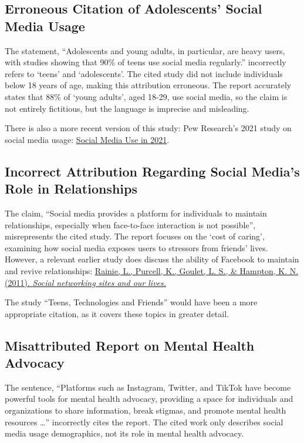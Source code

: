 \documentclass[12pt]{article}
\begin{document}
\subsection{Erroneous Citation of Adolescents' Social Media Usage}
The statement, ``Adolescents and young adults, in particular, are heavy users, with studies showing that 90\% of teens use social media regularly.'' incorrectly refers to `teens' and `adolescents'. The cited study did not include individuals below 18 years of age, making this attribution erroneous. The report accurately states that 88\% of `young adults', aged 18-29, use social media, so the claim is not entirely fictitious, but the language is imprecise and misleading.

There is also a more recent version of this study: Pew Research's 2021 study on social media usage: \href{https://www.pewresearch.org/internet/2021/04/07/social-media-use-in-2021/}{Social Media Use in 2021}.

\subsection{Incorrect Attribution Regarding Social Media's Role in Relationships}
The claim, ``Social media provides a platform for individuals to maintain relationships, especially when face-to-face interaction is not possible'', misrepresents the cited study. The report focuses on the `cost of caring', examining how social media exposes users to stressors from friends' lives. However, a relevant earlier study does discuss the ability of Facebook to maintain and revive relationships: \href{https://www.pewresearch.org/internet/2011/06/16/social-networking-sites-and-our-lives/}{Rainie, L., Purcell, K., Goulet, L. S., \& Hampton, K. N. (2011). \textit{Social networking sites and our lives.}}

The study ``Teens, Technologies and Friends'' would have been a more appropriate citation, as it covers these topics in greater detail.

\subsection{Misattributed Report on Mental Health Advocacy}
The sentence, ``Platforms such as Instagram, Twitter, and TikTok have become powerful tools for mental health advocacy, providing a space for individuals and organizations to share information, break stigmas, and promote mental health resources \dots'' incorrectly cites the report. The cited work only describes social media usage demographics, not its role in mental health advocacy.
\end{document}
